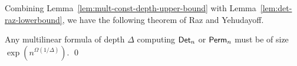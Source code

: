 Combining Lemma~\ref{lem:mult-const-depth-upper-bound} with Lemma~\ref{lem:det-raz-lowerbound}, we have the following theorem of Raz and Yehudayoff. 

\begin{theorem}
Any multilinear formula of depth $\Delta$ computing $\mathsf{Det}_n$ or $\mathsf{Perm}_n$ must be of size $\exp(n^{\Omega(1/\Delta)})$.  \qed
\end{theorem}



